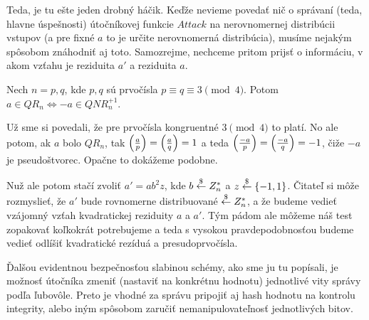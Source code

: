 Teda, je tu ešte jeden drobný háčik. Keďže nevieme povedať nič o
správaní (teda, hlavne úspešnosti) útočníkovej funkcie $Attack$
na nerovnomernej distribúcii vstupov (a pre fixné $a$ to je určite
nerovnomerná distribúcia), musíme nejakým spôsobom znáhodniť aj toto.
Samozrejme, nechceme pritom prijsť o informáciu, v akom vzťahu je
reziduita $a'$ a reziduita $a$.

\begin{lema}
    Nech $n=p,q$, kde $p,q$ sú prvočísla $p\equiv q\equiv 3 \pmod{4}$.
    Potom $a \in QR_n \iff -a \in QNR_n^{+1}$.
\end{lema}
\begin{dokaz}
    Už sme si povedali, že pre prvočísla kongruentné $3\pmod{4}$ to
    platí. No ale potom, ak $a$ bolo $QR_n$, tak
    $\left( \frac{a}{p} \right) = \left( \frac{a}{q} \right) =1$ a teda
    $\left( \frac{-a}{p} \right) = \left( \frac{-a}{q} \right) = -1$, čiže $-a$ je
    pseudoštvorec. Opačne to dokážeme podobne.
\end{dokaz}

Nuž ale potom stačí zvoliť
$a' = a b^2 z$, kde $b \overset{\$}{\leftarrow} Z_n^*$ a $z\overset{\$}{\leftarrow}\{-1,1\}$. 
Čitateľ si môže rozmyslieť, že $a'$ bude rovnomerne distribuované
$\overset{\$}{\leftarrow} Z_n^*$, a že budeme vedieť vzájomný vzťah kvadratickej reziduity
$a$ a $a'$. Tým pádom ale môžeme náš test zopakovať koľkokrát
potrebujeme a teda s vysokou pravdepodobnosťou budeme vedieť odlíšiť
kvadratické rezíduá a presudoprvočísla.

Ďalšou evidentnou bezpečnosťou slabinou schémy, ako sme ju tu
popísali, je možnosť útočníka zmeniť (nastaviť na konkrétnu hodnotu) jednotlivé vity správy podľa
ľubovôle. Preto je vhodné za správu pripojiť aj hash hodnotu na
kontrolu integrity, alebo iným spôsobom zaručiť nemanipulovateľnosť
jednotlivých bitov.

